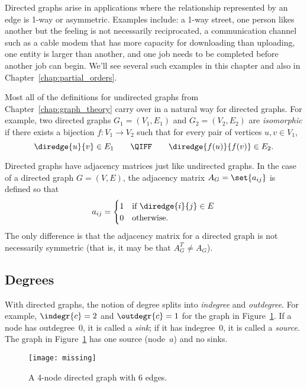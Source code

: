 Directed graphs arise in applications where the relationship
represented by an edge is 1-way or asymmetric.  Examples include: a
1-way street, one person likes another but the feeling is not
necessarily reciprocated, a communication channel such as a cable
modem that has more capacity for downloading than uploading, one
entity is larger than another, and one job needs to be completed
before another job can begin. We'll see several such examples in this
chapter and also in Chapter~\ref{chap:partial_orders}.

Most all of the definitions for undirected graphs from
Chapter~\ref{chap:graph_theory} carry over in a natural way for
directed graphs.  For example, two directed graphs $G_1 = (V_1, E_1)$
and $G_2 = (V_2, E_2)$ are \emph{isomorphic} if there exists a
bijection $f: V_1 \to V_2$ such that for every pair of vertices $u, v
\in V_1$,
\begin{equation*}
    \diredge{u}{v} \in E_1 \qquad \QIFF \qquad \diredge{f(u)}{f(v)} \in E_2.
\end{equation*}

Directed graphs have adjacency matrices just like undirected graphs.
In the case of a directed graph $G = (V, E)$, the adjacency matrix
$A_G = \set{ a_{ij} }$ is defined so that
\begin{equation*}
    a_{ij} = \begin{cases}
                1 & \text{if $\diredge{i}{j} \in E$} \\
                0 & \text{otherwise.}
              \end{cases}
\end{equation*}
The only difference is that the adjacency matrix for a directed graph
is not necessarily symmetric (that is, it may be that
$A_{G}^{T} \ne A_G$).

\subsection{Degrees}

With directed graphs, the notion of degree splits into \emph{indegree}
and \emph{outdegree}.  For example, $\indegr{c} = 2$ and $\outdegr{c}
= 1$ for the graph in Figure~\ref{fig:6EB}.  If a node has
outdegree~0, it is called a \emph{sink}; if it has indegree~0, it is
called a \emph{source}.  The graph in Figure~\ref{fig:6EB} has one
source (node~$a$) and no sinks.

\begin{figure}

\missinggraphic

\texttt{[image: missing]}

\caption{A 4-node directed graph with 6 edges.}

\label{fig:6EB}

\end{figure}

